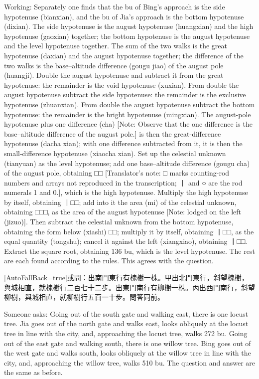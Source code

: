 \documentclass[11pt]{article}
\newcommand{\unitlabel}[1]{\marginpar{\raggedleft\tiny\color{gray}#1}}
\newenvironment{unitzh}{\par\CJKfontspec{Noto Serif CJK SC}[AutoFallBack=true]\large\linespread{1.25}\selectfont}{\par}
\newenvironment{uniten}{\par\small\color{black!85}}{\par\medskip}
\begin{document}
\begin{uniten}Working: Separately one finds that the bu of Bing's approach is the side hypotenuse (bianxian), and the bu of Jia's approach is the bottom hypotenuse (dixian). The side hypotenuse is the august hypotenuse (huangxian) and the high hypotenuse (gaoxian) together; the bottom hypotenuse is the august hypotenuse and the level hypotenuse together. The sum of the two walks is the great hypotenuse (daxian) and the august hypotenuse together; the difference of the two walks is the base–altitude difference (gougu jiao) of the august pole (huangji). Double the august hypotenuse and subtract it from the great hypotenuse: the remainder is the void hypotenuse (xuxian). From double the august hypotenuse subtract the side hypotenuse: the remainder is the exclusive hypotenuse (zhuanxian). From double the august hypotenuse subtract the bottom hypotenuse: the remainder is the bright hypotenuse (mingxian). The august-pole hypotenuse plus one difference (cha) [Note: Observe that the one difference is the base–altitude difference of the august pole.] is then the great-difference hypotenuse (dacha xian); with one difference subtracted from it, it is then the small-difference hypotenuse (xiaocha xian). Set up the celestial unknown (tianyuan) as the level hypotenuse; add one base–altitude difference (gougu cha) of the august pole, obtaining □□ [Translator's note: □ marks counting-rod numbers and arrays not reproduced in the transcription; 丨 and ○ are the rod numerals 1 and 0.], which is the high hypotenuse. Multiply the high hypotenuse by itself, obtaining 丨□□; add into it the area (mi) of the celestial unknown, obtaining □□□, as the area of the august hypotenuse [Note: lodged on the left (jizuo)]. Then subtract the celestial unknown from the bottom hypotenuse, obtaining the form below (xiashi) □□; multiply it by itself, obtaining 丨□□, as the equal quantity (tongshu); cancel it against the left (xiangxiao), obtaining 丨□□. Extract the square root, obtaining 136 bu, which is the level hypotenuse. The rest are each found according to the rules. This agrees with the question.\end{uniten}

\begin{unitzh}\unitlabel{ceyuan-029.8}或問：出南門東行有槐樹一株。甲出北門東行，斜望槐樹，與城相直，就槐樹行二百七十二步。出東門南行有柳樹一株。丙出西門南行，斜望柳樹，與城相直，就柳樹行五百一十步。問答同前。\end{unitzh}
\begin{uniten}Someone asks: Going out of the south gate and walking east, there is one locust tree. Jia goes out of the north gate and walks east, looks obliquely at the locust tree in line with the city, and, approaching the locust tree, walks 272 bu. Going out of the east gate and walking south, there is one willow tree. Bing goes out of the west gate and walks south, looks obliquely at the willow tree in line with the city, and, approaching the willow tree, walks 510 bu. The question and answer are the same as before.\end{uniten}
\end{document}
